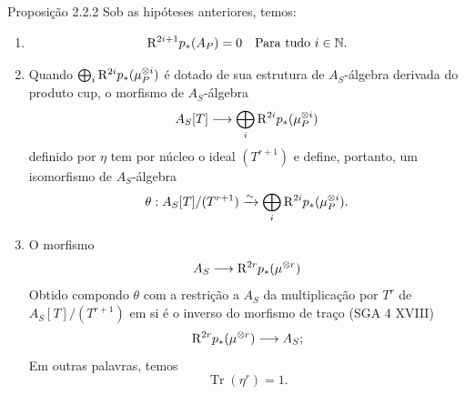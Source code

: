 \begin{statement}{Proposição 2.2.2}
Sob as hipóteses anteriores, temos:
\begin{enumerate}[label=\alph*)]
\item
\[
\mathrm{R}^{2i+1}p_*(A_P)=0\quad\text{Para tudo }i\in\mathbb N.
\]
\item Quando $\bigoplus_i \mathrm{R}^{2i}p_*(\mu_P^{\otimes i})$ é dotado de sua estrutura de $A_S$-álgebra derivada do produto cup, o morfismo de $A_S$-álgebra
\[
A_S[T]\longrightarrow \bigoplus_i \mathrm{R}^{2i}p_*(\mu_P^{\otimes i})
\]
definido por $\eta$ tem por núcleo o ideal $(T^{r+1})$ e define, portanto, um isomorfismo de $A_S$-álgebra
\[
\theta:A_S[T]/(T^{r+1})\xrightarrow{\sim}\bigoplus_i \mathrm{R}^{2i}p_*(\mu_P^{\otimes i}).
\]
\item O morfismo
\[
A_S\longrightarrow \mathrm{R}^{2r}p_*(\mu^{\otimes r})
\]
Obtido compondo $\theta$ com a restrição a $A_S$ da multiplicação por $T^r$ de $A_S[T]/(T^{r+1})$ em si é o inverso do morfismo de traço (SGA 4 XVIII)
\[
\mathrm{R}^{2r}p_*(\mu^{\otimes r})\longrightarrow A_S;
\]
Em outras palavras, temos
\[
\operatorname{Tr}(\eta^r)=1.
\]
\end{enumerate}
\end{statement}
